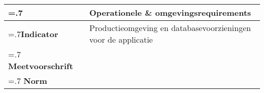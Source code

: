 \noindent
\begin{longtable}{|>{\raggedleft\hsize=.7\hsize\bfseries}X|
    >{\arraybackslash\hsize=1.3\hsize}X|} \hline
\multicolumn{1}{|l|}{\textbf{NFR}} & Operationele \& omgevingsrequirements\\ \hline
Indicator & Productieomgeving en databasevoorzieningen voor de applicatie
 \\  \hline
Meetvoorschrift & \\ \hline
Norm & \\ \hline
\end{longtable}